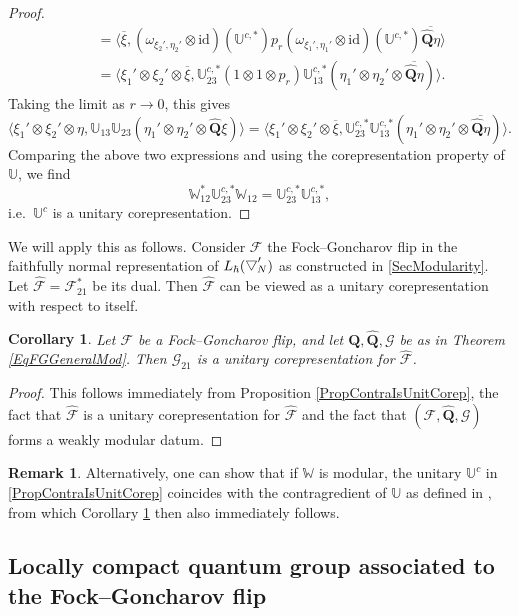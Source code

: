 \documentclass[11pt, reqno]{amsart}
\newtheorem{cor}[theorem]{Corollary}
\theoremstyle{definition}
\newtheorem{remark}[theorem]{Remark}
\numberwithin{equation}{section}
\newcommand{\Qb}{\mathbf{Q}}
\newcommand{\Fct}{\mathcal{F}}
\newcommand{\tFct}{\mathcal{G}}
\newcommand{\id}{\mathrm{id}}
\newcommand{\wbtd}[1]{\raisebox{\depth}{$\bigtriangledown'$\!\!}_{#1}}
\newcommand{\Wbb}{\mathbb{W}}
\newcommand{\Ubb}{\mathbb{U}}
\begin{document}
\begin{proof}
\begin{eqnarray*}
&&=    \langle \overline{\xi}, (\omega_{\xi_2',\eta_2'}\otimes \id)(\Ubb^{c,*}) p_r (\omega_{\xi_1',\eta_1'}\otimes \id)(\Ubb^{c,*})\overline{\hat{\Qb}\eta}\rangle \\
&& = \langle \xi_1' \otimes \xi_2' \otimes \overline{\xi},\Ubb_{23}^{c,*}(1\otimes 1 \otimes p_r)\Ubb_{13}^{c,*}(\eta_1'\otimes \eta_2'\otimes \overline{\hat{\Qb}\eta})\rangle.
\end{eqnarray*}
Taking the limit as $r \rightarrow 0$, this gives 
\[
\langle \xi_1' \otimes \xi_2' \otimes \eta,\Ubb_{13}\Ubb_{23}(\eta_1'\otimes \eta_2'\otimes \hat{\Qb}\xi)\rangle = \langle \xi_1' \otimes \xi_2' \otimes \overline{\xi},\Ubb_{23}^{c,*}\Ubb_{13}^{c,*}(\eta_1'\otimes \eta_2'\otimes \overline{\hat{\Qb}\eta})\rangle.
\]
Comparing the above two expressions and using the corepresentation property of $\Ubb$, we find 
\[
\Wbb_{12}^*\Ubb_{23}^{c,*}\Wbb_{12} = \Ubb_{23}^{c,*}\Ubb_{13}^{c,*},
\]
i.e.\ $\Ubb^c$ is a unitary corepresentation.
\end{proof}

We will apply this as follows. Consider $\Fct$ the Fock--Goncharov flip in the faithfully normal representation of $L_{\hbar}(\wbtd{N})$ as constructed in \eqref{SecModularity}. Let $\hat{\Fct} = \Fct_{21}^*$ be its dual. Then $\hat{\Fct}$ can be viewed as a unitary corepresentation with respect to itself.

\begin{cor}\label{CorContraRegLeft}
Let $\Fct$ be a Fock--Goncharov flip, and let $\Qb,\hat{\Qb},\tFct$ be as in Theorem \ref{EqFGGeneralMod}. Then $\tFct_{21}$ is a unitary corepresentation for $\hat{\Fct}$. 
\end{cor} 

\begin{proof}
This follows immediately from Proposition \ref{PropContraIsUnitCorep}, the fact that $\hat{\Fct}$ is a unitary corepresentation for $\hat{\Fct}$ and the fact that $(\Fct,\hat{\Qb},\tFct)$ forms a weakly modular datum.  
\end{proof} 

\begin{remark}
Alternatively, one can show that if $\Wbb$ is modular, the unitary $\Ubb^c$ in \eqref{PropContraIsUnitCorep} coincides with the contragredient of $\Ubb$ as defined in \cite[Definition 11]{SW07}, from which Corollary \ref{CorContraRegLeft} then also immediately follows.
\end{remark}

\subsection{Locally compact quantum group associated to the Fock--Goncharov flip}
\end{document}
